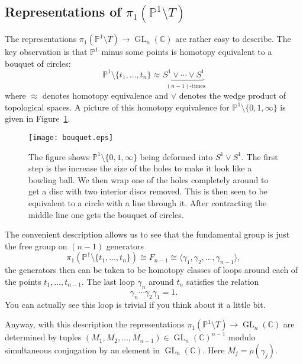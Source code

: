 \documentclass[]{book}
\numberwithin{equation}{section}
\theoremstyle{definition}
\theoremstyle{remark}
\newcommand{\CC}{\mathbb{C}}
\newcommand{\PP}{\mathbb{P}}
\newcommand{\GL}{\operatorname{GL}}
\begin{document}
\subsection{Representations of $\pi_1(\PP^1\setminus T)$}
The representations $\pi_1(\PP^1\setminus T) \to \GL_n(\CC)$ are rather easy to describe. 
The key observation is that $\PP^1$ minus some points is homotopy equivalent to a bouquet of circles:
$$ \PP^1 \setminus \lbrace t_1,\ldots,t_n\rbrace \approx \underbrace{S^1 \vee \cdots \vee S^1}_{ \mbox{ $(n-1)$-times}}$$
where $\approx$ denotes homotopy equivalence and $\vee$ denotes the wedge product of topological spaces. 
A picture of this homotopy equivalence for $\PP^1 \setminus \lbrace 0,1,\infty\rbrace$ is given in Figure~\ref{F:bouquet}.
\begin{figure}[h]\label{F:bouquet}
	\begin{center}
		\texttt{[image: bouquet.eps]}
	\end{center}
	\caption{The figure shows $\PP^1\setminus \lbrace 0, 1, \infty\rbrace$ being deformed into $S^1 \vee S^1$. 
		The first step is the increase the size of the holes to make it look like a bowling ball. 
		We then wrap one of the holes completely around to get a disc with two interior discs removed. 
		This is then seen to be equivalent to a circle with a line through it. 
		After contracting the middle line one gets the bouquet of circles. 
	}
\end{figure}
The convenient description allows us to see that the fundamental group is just the free group on $(n-1)$ generators
$$\pi_1(\PP^1\setminus\lbrace t_1,\ldots,t_n\rbrace) \cong F_{n-1} \cong \langle \gamma_1,\gamma_2,\ldots,\gamma_{n-1} \rangle,$$ 
the generators then can be taken to be homotopy classes of loops around each of the points $t_1,\ldots, t_{n-1}$. 
The last loop $\gamma_n$ around $t_n$ satisfies the relation 
$$ \gamma_n \cdots \gamma_2 \gamma_1  = 1.$$
You can actually see this loop is trivial if you think about it a little bit. 

Anyway, with this description the representations $\pi_1(\PP^1\setminus T) \to \GL_n(\CC)$ are determined by tuples $(M_1,M_2,\ldots,M_{n-1}) \in \GL_n(\CC)^{n-1}$ modulo simultaneous conjugation by an element in $\GL_n(\CC)$.
Here $M_j = \rho(\gamma_j)$. 

\end{document}
